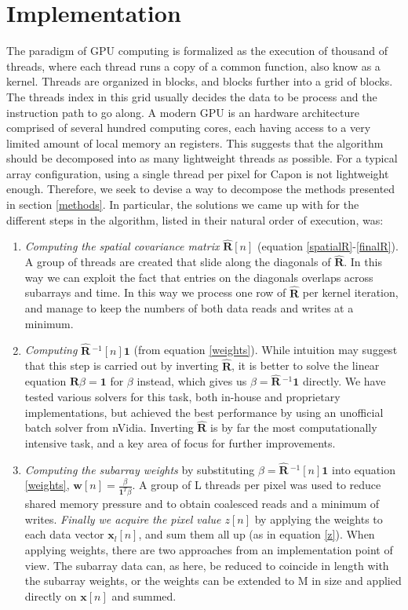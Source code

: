 \documentclass[10pt,a4paper]{article}
\newcommand\T{^{\scriptscriptstyle T}}
\renewcommand\vec[1]{\boldsymbol{#1}}
\newcommand\mat[1]{\boldsymbol{#1}}
\newcommand\1{\vec 1}
\newcommand*\x{\vec x}
\newcommand*\R{\mat R}
\newcommand*\eR{\mat{\hat R}}
\newcommand*\eRi{\hat{\mat R}\,\!^{-1}}
\renewcommand\gls[1]{#1}
\begin{document}
\section{Implementation}
The paradigm of \gls{GPU} computing is formalized as the execution of thousand of threads, where each thread runs a copy of a common function, also know as a kernel. Threads are organized in blocks, and blocks further into a grid of blocks. The threads index in this grid usually decides the data to be process and the instruction path to go along. A modern \gls{GPU} is an hardware architecture comprised of several hundred computing cores, each having access to a very limited amount of local memory an registers. This suggests that the algorithm should be decomposed into as many lightweight threads as possible. For a typical array configuration, using a single thread per pixel for Capon is not lightweight enough. Therefore, we seek to devise a way to decompose the methods presented in section \ref{methods}. In particular, the solutions we came up with for the different steps in the algorithm, listed in their natural order of execution, was:
\begin{enumerate}
\item \emph{Computing the spatial covariance matrix} $\eR[n]$ (equation \ref{spatialR}-\ref{finalR}). A group of threads are created that slide along the diagonals of $\eR$. In this way we can exploit the fact that entries on the diagonals overlaps across subarrays and time. 
In this way we process one row of $\eR$ per kernel iteration, and manage to keep the numbers of both data reads and writes at a minimum.
\item \emph{Computing} $\eRi[n]\1$ (from equation \ref{weights}). While intuition may suggest that this step is carried out by inverting $\eR$, it is better to solve the linear equation $\R\beta = \1$ for $\beta$ instead, which gives us $\beta = \eRi\1$ directly. We have tested various solvers for this task, both in-house and proprietary implementations, but achieved the best performance by using an unofficial batch solver from nVidia. Inverting $\eR$ is by far the most computationally intensive task, and a key area of focus for further improvements.
\item \emph{Computing the subarray weights} by substituting $\beta = \eRi[n]\1$ into equation \ref{weights}, $\vec w[n] = \frac{\beta}{\1\T\beta}$. A group of L threads per pixel was used to reduce shared memory pressure and to obtain coalesced reads and a minimum of writes. \emph{Finally we acquire the pixel value $z[n]$} by applying the weights to each data vector $\x_l[n]$, and sum them all up (as in equation \ref{z}). When applying weights, there are two approaches from an implementation point of view. The subarray data can, as here, be reduced to coincide in length with the subarray weights, or the weights can be extended to M in size and applied directly on $\x[n]$ and summed.  
\end{enumerate}
\end{document}
